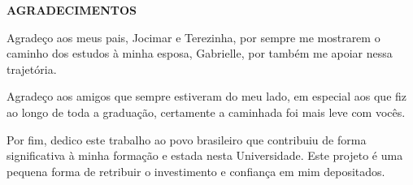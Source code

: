 \thispagestyle{plain}
\begin{center}
    \textbf{AGRADECIMENTOS}
\end{center}


Agradeço aos meus pais, Jocimar e Terezinha, por sempre me mostrarem o caminho dos estudos à minha esposa, Gabrielle, por também me apoiar nessa trajetória.


Agradeço aos amigos que sempre estiveram do meu lado, em especial aos que fiz ao longo de toda a graduação, certamente a caminhada foi mais leve com vocês.


Por fim, dedico este trabalho ao povo brasileiro que contribuiu de forma significativa à minha formação e estada nesta Universidade. Este projeto é uma pequena forma de retribuir o investimento e confiança em mim depositados.
